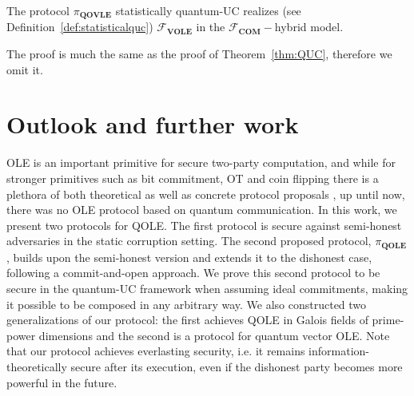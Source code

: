 \begin{theorem}

The protocol $\mathcal{\pi}_{\textbf{QOVLE}}$ statistically quantum-UC realizes  (see Definition~\ref{def:statisticalquc}) $\mathcal{F}_{\textbf{VOLE}}$ in the $\mathcal{F}_{\textbf{COM}}-$hybrid model.
\label{thm:QUC-VOLE}
\end{theorem}

The proof is much the same as the proof of Theorem~\ref{thm:QUC}, therefore we omit it.


\section{Outlook and further work} 

OLE is an important primitive for secure two-party computation, and while for stronger primitives such as bit commitment, OT  and coin flipping there is a plethora of both theoretical as well as concrete protocol proposals \cite{M05, MTVUZ05, BBBG09, BBBGST11, DV12, SG12, KWW12, NJCKW12, KC13, PJLCLTKD14, LAAPMP14, LAPPP16, ARW19, BCKD20,  SY20,  ARV21,  SMP22}, up until now, there was no OLE protocol based on quantum communication. In this work, we present two protocols for QOLE. The first protocol is secure against semi-honest adversaries in the static corruption setting. The second proposed protocol, $\pi_{\textbf{QOLE}}$, builds upon the semi-honest version and extends it to the dishonest case, following a commit-and-open approach. We prove this second protocol to be secure in the quantum-UC framework when assuming ideal commitments, making it possible to be composed in any arbitrary way. We also constructed two generalizations of our protocol: the first achieves QOLE in Galois fields of prime-power dimensions and the second is a protocol for quantum vector OLE.
 Note that our protocol achieves everlasting security, i.e. it remains information-theoretically secure after its execution, even if the dishonest party becomes more powerful in the future.

